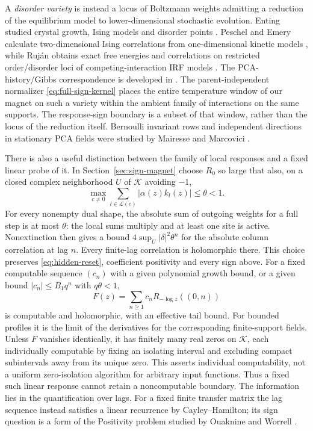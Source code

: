 A \emph{disorder variety} is instead a locus of Boltzmann weights admitting a reduction of the equilibrium model to lower-dimensional stochastic evolution. Enting studied crystal growth, Ising models and disorder points \cite{enting}. Peschel and Emery calculate two-dimensional Ising correlations from one-dimensional kinetic models \cite{peschelEmery}, while Ruj\'an obtains exact free energies and correlations on restricted order/disorder loci of competing-interaction IRF models \cite{rujan}. The PCA-history/Gibbs correspondence is developed in \cite{dk,lms}. The parent-independent normalizer \eqref{eq:full-sign-kernel} places the entire temperature window of our magnet on such a variety within the ambient family of interactions on the same supports. The response-sign boundary is a subset of that window, rather than the locus of the reduction itself. Bernoulli invariant rows and independent directions in stationary PCA fields were studied by Mairesse and Marcovici \cite{mairesseMarcovici}.

There is also a useful distinction between the family of local responses and a fixed linear probe of it. In Section~\ref{sec:sign-magnet} choose \(R_0\) so large that also, on a closed complex neighborhood \(U\) of \(\mathcal K\) avoiding \(-1\),
\[
 \max_{c\ne0}\sum_{l\in\mathcal L(c)}|\alpha(z)k_l(z)|\le\theta<1.
\]
For every nonempty dual shape, the absolute sum of outgoing weights for a full step is at most \(\theta\): the local sums multiply and at least one site is active. Nonextinction then gives a bound \(4\sup_U|\delta|^2\theta^n\) for the absolute column correlation at lag \(n\). Every finite-lag correlation is holomorphic there. This choice preserves \eqref{eq:hidden-reset}, coefficient positivity and every sign above. For a fixed computable sequence \((c_n)\) with a given polynomial growth bound, or a given bound \(|c_n|\le B_1q^n\) with \(q\theta<1\),
\[
 F(z)=\sum_{n\ge1}c_n R_{-\log z}((0,n))
\]
is computable and holomorphic, with an effective tail bound. For bounded profiles it is the limit of the derivatives for the corresponding finite-support fields. Unless \(F\) vanishes identically, it has finitely many real zeros on \(\mathcal K\), each individually computable by fixing an isolating interval and excluding compact subintervals away from its unique zero. This asserts individual computability, not a uniform zero-isolation algorithm for arbitrary input functions. Thus a fixed such linear response cannot retain a noncomputable boundary. The information lies in the quantification over lags. For a fixed finite transfer matrix the lag sequence instead satisfies a linear recurrence by Cayley--Hamilton; its sign question is a form of the Positivity problem studied by Ouaknine and Worrell \cite{ouaknineWorrell}.
